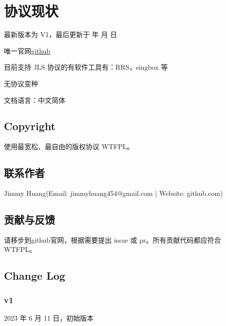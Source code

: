 \renewcommand{\today}{\number\year 年 \number\month 月 \number\day 日}

\chapter{协议现状}

最新版本为 V1，最后更新于 \today

唯一官网\href{https://github.com}{github}

目前支持 JLS 协议的有软件工具有：RRS，singbox 等

无协议变种

文档语言：中文简体


\section{Copyright}
使用最宽松、最自由的版权协议 WTFPL。

\section{联系作者}
Jimmy Huang(Email: jimmyhuang454@gmail.com | Website: github.com)


\section{贡献与反馈}
请移步到github官网，根据需要提出 issue 或 pr。所有贡献代码都应符合 WTFPL。

\section{Change Log}
\subsection{v1}
2023 年 6 月 11 日，初始版本
